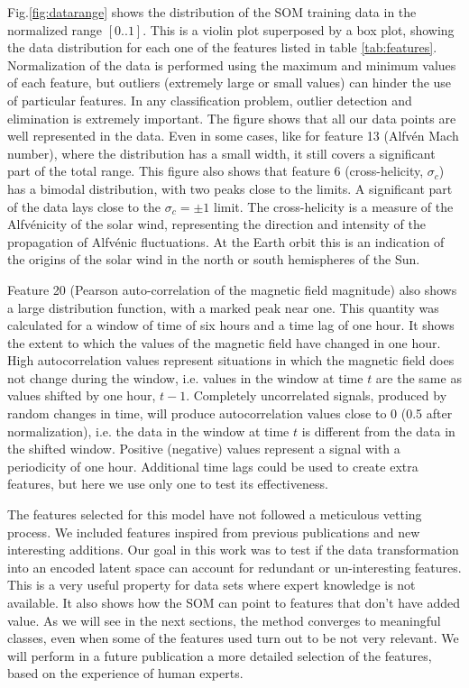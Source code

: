 \documentclass[utf8]{frontiersSCNS} %
\begin{document}
Fig.\ref{fig:datarange} shows the distribution of the SOM training data in the normalized range $\left[0..1\right]$. This is a violin plot superposed by a box plot, showing the data distribution for each one of the features listed in table \ref{tab:features}. Normalization of the data is performed using the maximum and minimum values of each feature, but outliers (extremely large or small values) can hinder the use of particular features. In any classification problem, outlier detection and elimination is extremely important. The figure shows that all our data points are well represented in the data. Even in some cases, like for feature 13 (Alfv\'en Mach number), where the distribution has a small width, it still covers a significant part of the total range. This figure also shows that feature 6 (cross-helicity, $\sigma_c$) has a bimodal distribution, with two peaks close to the limits. A significant part of the data lays close to the $\sigma_c = \pm 1$ limit. The cross-helicity is a measure of the Alfv\'enicity of the solar wind, representing the direction and intensity of the propagation of Alfv\'enic fluctuations. At the Earth orbit this is an indication of the origins of the solar wind in the north or south hemispheres of the Sun.

Feature 20 (Pearson auto-correlation of the magnetic field magnitude) also shows a large distribution function, with a marked peak near one. This quantity was calculated for a window of time of six hours and a time lag of one hour. It shows the extent to which the values of the magnetic field have changed in one hour. High autocorrelation values represent situations in which the magnetic field does not change during the window, i.e. values in the window at time $t$ are the same as values shifted by one hour, $t-1$. Completely uncorrelated signals, produced by random changes in time, will produce autocorrelation values close to 0 (0.5 after normalization), i.e. the data in the window at time $t$ is different from the data in the shifted window. Positive (negative) values represent a signal with a periodicity of one hour. Additional time lags could be used to create extra features, but here we use only one to test its effectiveness.

The features selected for this model have not followed a meticulous vetting process. We included features inspired from previous publications and new interesting additions. Our goal in this work was to test if the data transformation into an encoded latent space can account for redundant or un-interesting features. This is a very useful property for data sets where expert knowledge is not available. It also shows how the SOM can point to features that don't have added value. As we will see in the next sections, the method converges to meaningful classes, even when some of the features used turn out to be not very relevant. We will perform in a future publication a more detailed selection of the features, based on the experience of human experts. 
\end{document}
